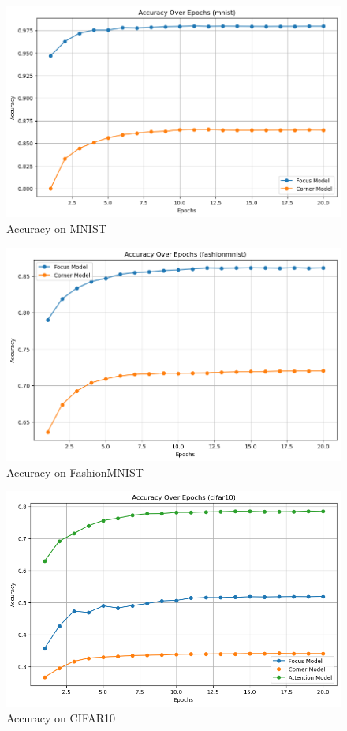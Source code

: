 \begin{figure}[hbt!]
    \centering
    \includegraphics[width=\linewidth]{images/mnist.png}
    \caption{Accuracy on MNIST}
    \label{fig:mnist}
\end{figure}
\begin{figure}[hbt!]
    \centering
    \includegraphics[width=\linewidth]{images/fashion.png}
    \caption{Accuracy on FashionMNIST}
    \label{fig:fashion}
\end{figure}
\begin{figure}[hbt!]
    \centering
    \includegraphics[width=\linewidth]{images/cifar.png}
    \caption{Accuracy on CIFAR10}
    \label{fig:cifar}
\end{figure}

